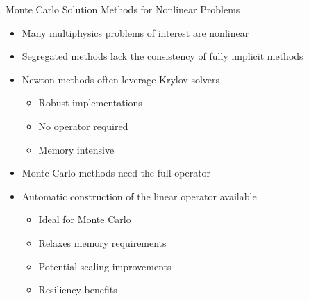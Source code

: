 \documentclass{beamer}
\begin{document}
\begin{frame}{Monte Carlo Solution Methods for Nonlinear Problems}

  \begin{itemize}
  \item Many multiphysics problems of interest are nonlinear
  \item Segregated methods lack the consistency of fully implicit
    methods
  \item Newton methods often leverage Krylov solvers
    \begin{itemize}
    \item Robust implementations
    \item No operator required
    \item Memory intensive
    \end{itemize}
  \item Monte Carlo methods need the full operator
  \item Automatic construction of the linear operator available
    \begin{itemize}
    \item Ideal for Monte Carlo
    \item Relaxes memory requirements
    \item Potential scaling improvements
    \item Resiliency benefits
    \end{itemize}
  \end{itemize}

\end{frame}
\end{document}
